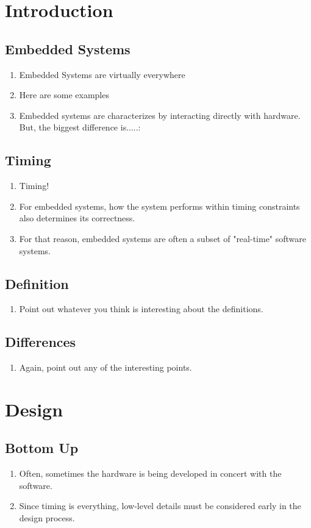 \documentclass{article}
\begin{document}
\section{Introduction}
\subsection{Embedded Systems}
\begin{enumerate}
\item Embedded Systems are virtually everywhere
\item Here are some examples
\item Embedded systems are characterizes by interacting directly with hardware.  But, the biggest difference is.....:
\end{enumerate}
\subsection{Timing}
\begin{enumerate}
\item Timing!
\item For embedded systems, how the system performs within timing constraints also determines its correctness.
\item For that reason, embedded systems are often a subset of "real-time" software systems.
\end{enumerate}
\subsection{Definition}
\begin{enumerate}
\item Point out whatever you think is interesting about the definitions.
\end{enumerate}
\subsection{Differences}
\begin{enumerate}
\item Again, point out any of the interesting points.
\end{enumerate}

\newpage
\section{Design}
\subsection{Bottom Up}
\begin{enumerate}
\item Often, sometimes the hardware is being developed in concert with the software.
\item Since timing is everything, low-level details must be considered early in the design process.
\end{enumerate}
\end{document}
